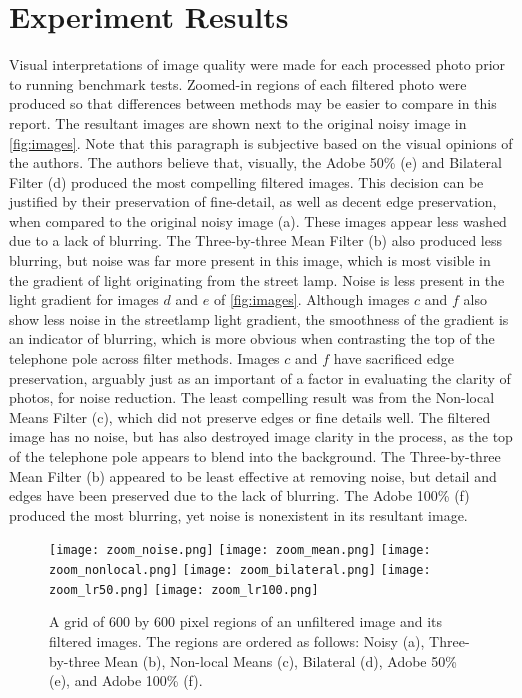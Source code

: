 \documentclass{ncjms}
\begin{document}
\section{Experiment Results}
Visual interpretations of image quality were made for each processed photo prior to running benchmark tests. Zoomed-in regions of each filtered photo were produced so that differences between methods may be easier to compare in this report. The resultant images are shown next to the original noisy image in \autoref{fig:images}. Note that this paragraph is subjective based on the visual opinions of the authors. The authors believe that, visually, the Adobe 50\% (e) and Bilateral Filter (d) produced the most compelling filtered images. This decision can be justified by their preservation of fine-detail, as well as decent edge preservation, when compared to the original noisy image (a). These images appear less washed due to a lack of blurring. The Three-by-three Mean Filter (b) also produced less blurring, but noise was far more present in this image, which is most visible in the gradient of light originating from the street lamp. Noise is less present in the light gradient for images $d$ and $e$ of \autoref{fig:images}. Although images $c$ and $f$ also show less noise in the streetlamp light gradient, the smoothness of the gradient is an indicator of blurring, which is more obvious when contrasting the top of the telephone pole across filter methods. Images $c$ and $f$ have sacrificed edge preservation,  arguably just as an important of a factor in evaluating the clarity of photos, for noise reduction. The least compelling result was from the Non-local Means Filter (c), which did not preserve edges or fine details well. The filtered image has no noise, but has also destroyed image clarity in the process, as the top of the telephone pole appears to blend into the background. The Three-by-three Mean Filter (b) appeared to be least effective at removing noise, but detail and edges have been preserved due to the lack of blurring. The Adobe 100\% (f) produced the most blurring, yet noise is nonexistent in its resultant image.

\begin{figure}[h]
  \centering
    \texttt{[image: zoom\_noise.png]}
    \texttt{[image: zoom\_mean.png]}
    \texttt{[image: zoom\_nonlocal.png]}
    \texttt{[image: zoom\_bilateral.png]}
    \texttt{[image: zoom\_lr50.png]}
    \texttt{[image: zoom\_lr100.png]}
  \caption{A grid of 600 by 600 pixel regions of an unfiltered image and its filtered images. The regions are ordered as follows: Noisy (a), Three-by-three Mean (b), Non-local Means (c), Bilateral (d), Adobe 50\% (e), and Adobe 100\% (f).}
  \label{fig:images}
\end{figure}
\end{document}
